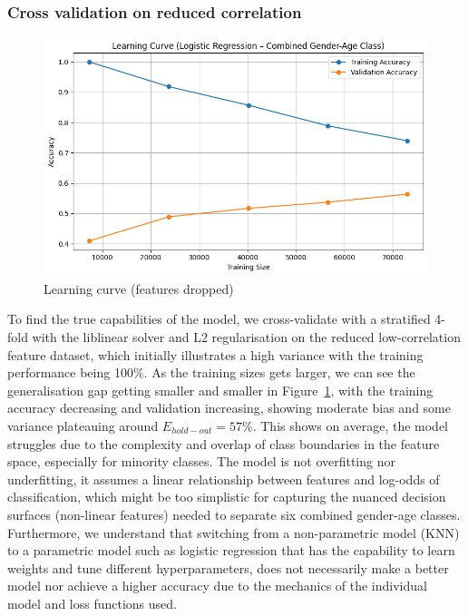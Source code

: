 \documentclass[10pt,twocolumn]{article}
\begin{document}
\subsubsection{Cross validation on reduced correlation}
\begin{figure}[H]
    \centering
    \includegraphics[width=1\linewidth]{images/lr/cross-validation - reduced.png}
    \caption{Learning curve (features dropped)}
    \label{fig:lr-learning-curve}
\end{figure}
To find the true capabilities of the model, we cross-validate with a stratified 4-fold with the liblinear solver and L2 regularisation on the reduced low-correlation feature dataset, which initially illustrates a high variance with the training performance being 100\%. As the training sizes gets larger, we can see the generalisation gap getting smaller and smaller in Figure~\ref{fig:lr-learning-curve}, with the training accuracy decreasing and validation increasing, showing moderate bias and some variance plateauing around $E_{hold-out}=57$\%. This shows on average, the model struggles due to the complexity and overlap of class boundaries in the feature space, especially for minority classes. The model is not overfitting nor underfitting, it assumes a linear relationship between features and log-odds of classification, which might be too simplistic for capturing the nuanced decision surfaces (non-linear features) needed to separate six combined gender-age classes. Furthermore, we understand that switching from a non-parametric model (KNN) to a parametric model such as logistic regression that has the capability to learn weights and tune different hyperparameters, does not necessarily make a better model nor achieve a higher accuracy due to the mechanics of the individual model and loss functions used.
\end{document}
